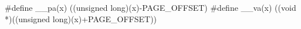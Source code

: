 \documentclass[varwidth=29em,crop]{standalone}
\begin{document}
\begin{ccode}
#define __pa(x) ((unsigned long)(x)-PAGE_OFFSET)
#define __va(x) ((void *)((unsigned long)(x)+PAGE_OFFSET))  
\end{ccode}
\end{document}

